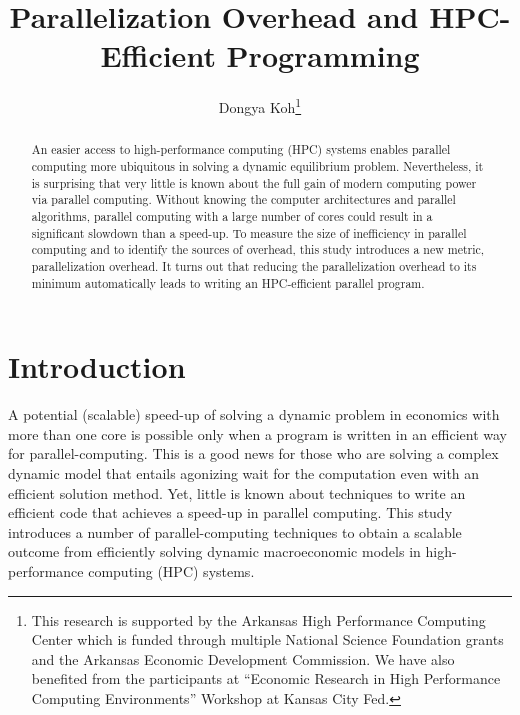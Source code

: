 \documentclass[12pt]{article}
\begin{document}
\sf

\title{\textbf{Parallelization Overhead and HPC-Efficient Programming}}
\author{Dongya Koh\thanks{\sf This research is supported by the Arkansas High Performance Computing Center which is funded through multiple National Science Foundation grants and the Arkansas Economic Development Commission. We have also benefited from the participants at ``Economic Research in High Performance Computing Environments'' Workshop at Kansas City Fed.}}
\maketitle


\begin{abstract}
An easier access to high-performance computing (HPC) systems enables parallel computing more ubiquitous in solving a dynamic equilibrium problem. Nevertheless, it is surprising that very little is known about the full gain of modern computing power via parallel computing. Without knowing the computer architectures and parallel algorithms, parallel computing with a large number of cores could result in a significant slowdown than a speed-up. To measure the size of inefficiency in parallel computing and to identify the sources of overhead, this study introduces a new metric, parallelization overhead. It turns out that reducing the parallelization overhead to its minimum automatically leads to writing an HPC-efficient parallel program.
\end{abstract}


\newpage
\section{Introduction}

A potential (scalable) speed-up of solving a dynamic problem in economics with more than one core is possible only when a program is written in an efficient way for parallel-computing. This is a good news for those who are solving a complex dynamic model that entails agonizing wait for the computation even with an efficient solution method. Yet, little is known about techniques to write an efficient code that achieves a speed-up in parallel computing. This study introduces a number of parallel-computing techniques to obtain a scalable outcome from efficiently solving dynamic macroeconomic models in high-performance computing (HPC) systems.
\end{document}
